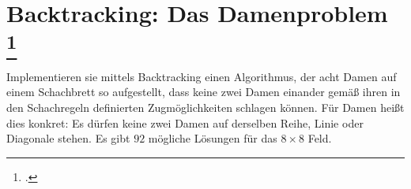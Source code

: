 \documentclass{lehramt-informatik-aufgabe}
\begin{document}

\section{Backtracking: Das Damenproblem
\footcite[Seite 18 - 19]{aud:fs:3}}

Implementieren sie mittels Backtracking einen Algorithmus, der acht
Damen auf einem Schachbrett so aufgestellt, dass keine zwei Damen
einander gemäß ihren in den Schachregeln definierten Zugmöglichkeiten
schlagen können. Für Damen heißt dies konkret: Es dürfen keine zwei
Damen auf derselben Reihe, Linie oder Diagonale stehen. Es gibt $92$
mögliche Lösungen für das $8 \times 8$ Feld.

\begin{liAntwort}
\end{liAntwort}

\begin{liAdditum}
\end{liAdditum}
\end{document}
